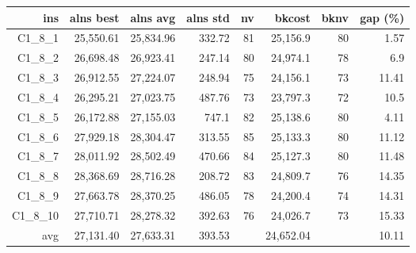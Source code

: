   \begin{table}[caption={Kết quả đo với tập HG\_C\_1\_8 800 yêu cầu}, label=exp:HGC18]
    \small
    \centering
    \begin{tabular}{rrrrrrrr}
    \hline
    ins & alns best & alns avg & alns std & nv & bkcost & bknv & gap (\%) \\ \hline
    C1\_8\_1 & 25,550.61 & 25,834.96 & 332.72 & 81 & 25,156.9 & 80 & 1.57 \\ \hline
    C1\_8\_2 & 26,698.48 & 26,923.41 & 247.14 & 80 & 24,974.1 & 78 & 6.9 \\ \hline
    C1\_8\_3 & 26,912.55 & 27,224.07 & 248.94 & 75 & 24,156.1 & 73 & 11.41 \\ \hline
    C1\_8\_4 & 26,295.21 & 27,023.75 & 487.76 & 73 & 23,797.3 & 72 & 10.5 \\ \hline
    C1\_8\_5 & 26,172.88 & 27,155.03 & 747.1 & 82 & 25,138.6 & 80 & 4.11 \\ \hline
    C1\_8\_6 & 27,929.18 & 28,304.47 & 313.55 & 85 & 25,133.3 & 80 & 11.12 \\ \hline
    C1\_8\_7 & 28,011.92 & 28,502.49 & 470.66 & 84 & 25,127.3 & 80 & 11.48 \\ \hline
    C1\_8\_8 & 28,368.69 & 28,716.28 & 208.72 & 83 & 24,809.7 & 76 & 14.35 \\ \hline
    C1\_8\_9 & 27,663.78 & 28,370.25 & 486.05 & 78 & 24,200.4 & 74 & 14.31 \\ \hline
    C1\_8\_10 & 27,710.71 & 28,278.32 & 392.63 & 76 & 24,026.7 & 73 & 15.33 \\ \hline
    avg & 27,131.40 & 27,633.31 & 393.53 & & 24,652.04 & & 10.11 \\ \hline
    \end{tabular}
  \end{table}

